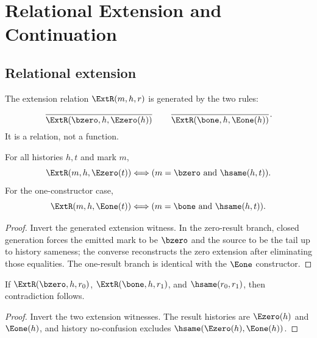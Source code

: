 \chapter{Relational Extension and Continuation}
\label{ch:core-relational-extension-and-continuation}

\section{Relational extension}

\begin{definition}
\label{def:extension-relation}
The extension relation \(\ExtR(m,h,r)\) is generated by the two rules:
$$
\frac{}{\ExtR(\bzero,h,\Ezero(h))}
\qquad
\frac{}{\ExtR(\bone,h,\Eone(h))}.
$$
It is a relation, not a function.
\end{definition}

\begin{theorem}
\label{thm:extension-result-constructor-characterization}
For all histories $h,t$ and mark $m$,
$$
\ExtR(m,h,\Ezero(t))\Longleftrightarrow (m=\bzero\ \text{and}\ \hsame(h,t)).
$$
For the one-constructor case,
$$
\ExtR(m,h,\Eone(t))\Longleftrightarrow (m=\bone\ \text{and}\ \hsame(h,t)).
$$
\end{theorem}
\begin{proof}
Invert the generated extension witness. In the zero-result branch, closed
generation forces the emitted mark to be \(\bzero\) and the source to be the
tail up to history sameness; the converse reconstructs the zero extension after
eliminating those equalities. The one-result branch is identical with the
\(\Eone\) constructor.
\end{proof}

\begin{lemma}
\label{lem:extension-cross-mark-result-separation}
If \(\ExtR(\bzero,h,r_0)\), \(\ExtR(\bone,h,r_1)\), and \(\hsame(r_0,r_1)\), then contradiction follows.
\end{lemma}
\begin{proof}
Invert the two extension witnesses. The result histories are \(\Ezero(h)\) and \(\Eone(h)\), and history no-confusion excludes \(\hsame(\Ezero(h),\Eone(h))\).
\end{proof}

